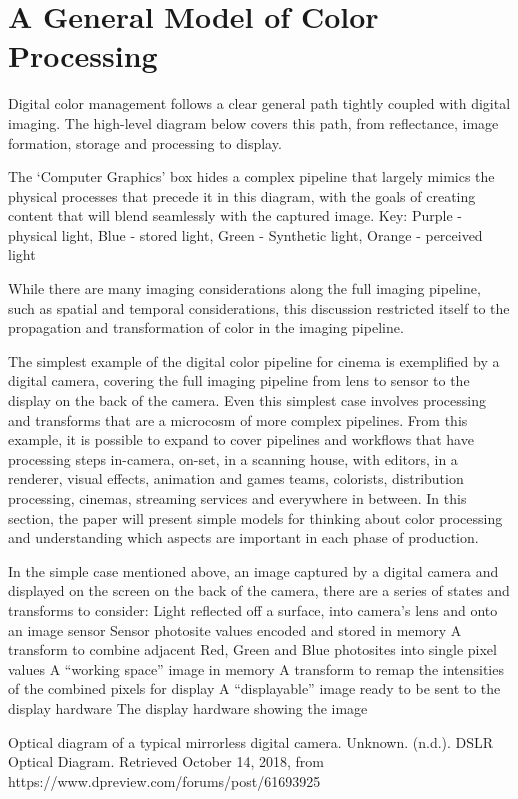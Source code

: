 \section{A General Model of Color Processing}

Digital color management follows a clear general path tightly coupled with digital imaging. The high-level diagram below covers this path, from reflectance, image formation, storage and processing to display.

The ‘Computer Graphics’ box hides a complex pipeline that largely mimics the physical processes that precede it in this diagram, with the goals of creating content that will blend seamlessly with the captured image. Key: Purple - physical light, Blue - stored light, Green - Synthetic light, Orange - perceived light

While there are many imaging considerations along the full imaging pipeline, such as spatial and temporal considerations, this discussion restricted itself to the propagation and transformation of color in the imaging pipeline.

The simplest example of the digital color pipeline for cinema is exemplified by a digital camera, covering the full imaging pipeline from lens to sensor to the display on the back of the camera. Even this simplest case involves processing and transforms that are a microcosm of more complex pipelines. From this example, it is possible to expand to cover pipelines and workflows that have processing steps in-camera, on-set, in a scanning house, with editors, in a renderer, visual effects, animation and games teams, colorists, distribution processing, cinemas, streaming services and everywhere in between. In this section, the paper will present simple models for thinking about color processing and understanding which aspects are important in each phase of production.

In the simple case mentioned above, an image captured by a digital camera and displayed on the screen on the back of the camera, there are a series of states and transforms to consider:
Light reflected off a surface, into camera’s lens and onto an image sensor
Sensor photosite values encoded and stored in memory
A transform to combine adjacent Red, Green and Blue photosites into single pixel values
A “working space” image in memory
A transform to remap the intensities of the combined pixels for display
A “displayable” image ready to be sent to the display hardware
The display hardware showing the image


Optical diagram of a typical mirrorless digital camera.
Unknown. (n.d.). DSLR Optical Diagram. Retrieved October 14, 2018, from https://www.dpreview.com/forums/post/61693925

